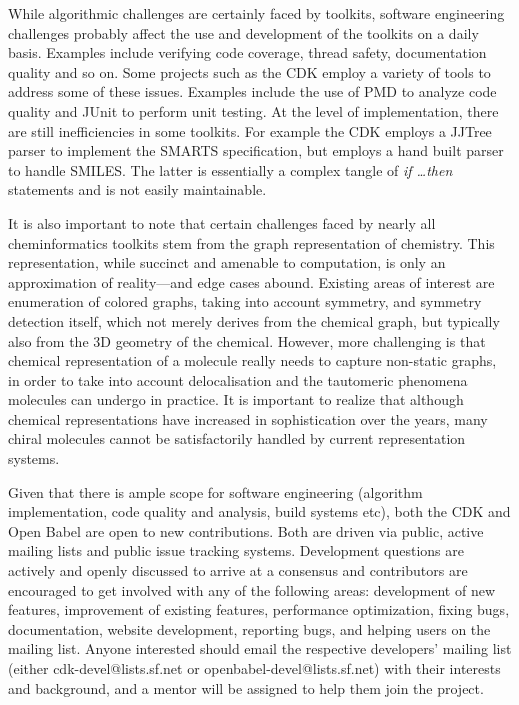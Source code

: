 \documentclass{sig-alternate}
\begin{document}
While algorithmic challenges are certainly faced by toolkits, software
engineering challenges probably affect the use and development of the
toolkits on a daily basis. Examples include verifying code coverage,
thread safety, documentation quality and so on. Some projects such as
the CDK employ a variety of tools to address some of these issues.
Examples include the use of PMD to analyze code quality and JUnit to
perform unit testing. At the level of implementation, there are still
inefficiencies in some toolkits. For example the CDK employs a JJTree
parser to implement the SMARTS specification, but employs a hand built
parser to handle SMILES. The latter is essentially a complex tangle of
\emph{if \ldots then} statements and is not easily maintainable.

It is also important to note that certain challenges faced by nearly
all cheminformatics toolkits stem from the graph representation of
chemistry. This representation, while succinct and amenable to
computation, is only an approximation of reality---and edge cases
abound. Existing areas of interest are enumeration of colored graphs,
taking into account symmetry, and symmetry detection itself, which not
merely derives from the chemical graph, but typically also from the 3D
geometry of the chemical. However, more challenging is that chemical
representation of a molecule really needs to capture non-static
graphs, in order to take into account delocalisation and the tautomeric
phenomena molecules can undergo in practice. It is important to
realize that although chemical representations have increased in
sophistication over the years, many chiral molecules cannot be
satisfactorily handled by current representation systems.


Given that there is ample scope for software engineering (algorithm
implementation, code quality and analysis, build systems etc), both
the CDK and Open Babel are open to new contributions. Both are driven
via public, active mailing lists and public issue tracking systems.
Development questions are actively and openly discussed to arrive at a
consensus and contributors are encouraged to get involved with any of
the following areas: development of new features, improvement of
existing features, performance optimization, fixing bugs,
documentation, website development, reporting bugs, and helping users
on the mailing list. Anyone interested should email the respective
developers' mailing list (either cdk-devel@lists.sf.net or
openbabel-devel@lists.sf.net) with their interests and background, and
a mentor will be assigned to help them join the project.
\end{document}
